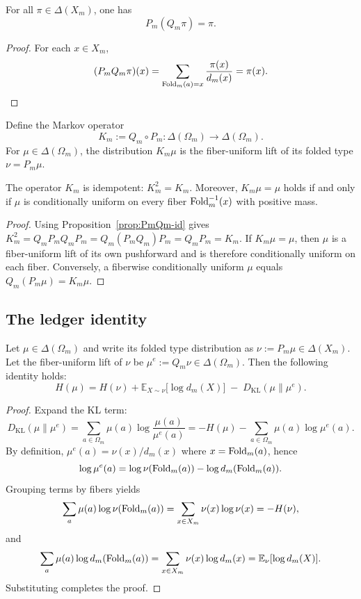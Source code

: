\begin{proposition}\label{prop:PmQm-id}
For all $\pi\in\Delta(X_m)$, one has
\[
P_m(Q_m\pi)=\pi.
\]
\end{proposition}

\begin{proof}
For each $x\in X_m$,
\[
(P_mQ_m\pi)(x)=\sum_{\mathrm{Fold}_m(a)=x}\frac{\pi(x)}{d_m(x)}=\pi(x).
\]
\end{proof}

\begin{definition}\label{def:fiber-reflector}
Define the Markov operator
\[
K_m:=Q_m\circ P_m:\Delta(\Omega_m)\to\Delta(\Omega_m).
\]
For $\mu\in\Delta(\Omega_m)$, the distribution $K_m\mu$ is the fiber-uniform lift of its folded type $\nu=P_m\mu$.
\end{definition}

\begin{proposition}\label{prop:Km-idempotent}
The operator $K_m$ is idempotent: $K_m^2=K_m$.
Moreover, $K_m\mu=\mu$ holds if and only if $\mu$ is conditionally uniform on every fiber $\mathrm{Fold}_m^{-1}(x)$ with positive mass.
\end{proposition}

\begin{proof}
Using Proposition~\ref{prop:PmQm-id} gives
\(
K_m^2=Q_mP_mQ_mP_m=Q_m(P_mQ_m)P_m=Q_mP_m=K_m.
\)
If $K_m\mu=\mu$, then $\mu$ is a fiber-uniform lift of its own pushforward and is therefore conditionally uniform on each fiber.
Conversely, a fiberwise conditionally uniform $\mu$ equals $Q_m(P_m\mu)=K_m\mu$.
\end{proof}

\subsection{The ledger identity}\label{subsec:ledger-identity}

\begin{theorem}\label{thm:information-ledger}
Let $\mu\in\Delta(\Omega_m)$ and write its folded type distribution as $\nu:=P_m\mu\in\Delta(X_m)$.
Let the fiber-uniform lift of $\nu$ be $\mu^{e}:=Q_m\nu\in\Delta(\Omega_m)$.
Then the following identity holds:
\[
\boxed{\;
H(\mu)=H(\nu)+\mathbb{E}_{X\sim\nu}\!\bigl[\log d_m(X)\bigr]\;-\;D_{\mathrm{KL}}(\mu\|\mu^{e}).
\;}
\]
\end{theorem}

\begin{proof}
Expand the KL term:
\[
D_{\mathrm{KL}}(\mu\|\mu^e)=\sum_{a\in\Omega_m}\mu(a)\log\frac{\mu(a)}{\mu^e(a)}
=-H(\mu)-\sum_{a\in\Omega_m}\mu(a)\log\mu^e(a).
\]
By definition, $\mu^e(a)=\nu(x)/d_m(x)$ where $x=\mathrm{Fold}_m(a)$, hence
\[
\log\mu^e(a)=\log\nu(\mathrm{Fold}_m(a))-\log d_m(\mathrm{Fold}_m(a)).
\]
Grouping terms by fibers yields
\[
\sum_a \mu(a)\log\nu(\mathrm{Fold}_m(a))=\sum_{x\in X_m}\nu(x)\log\nu(x)=-H(\nu),
\]
and
\[
\sum_a \mu(a)\log d_m(\mathrm{Fold}_m(a))=\sum_{x\in X_m}\nu(x)\log d_m(x)=\mathbb{E}_\nu[\log d_m(X)].
\]
Substituting completes the proof.
\end{proof}

